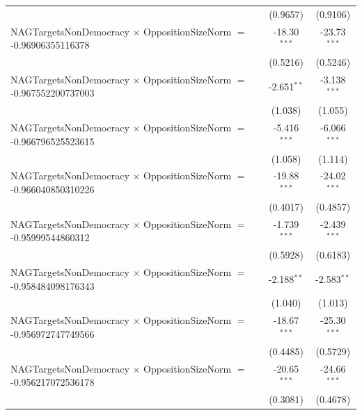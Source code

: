 \begin{tabular}{lcc}
                                                                                & (0.9657)             & (0.9106)\\   
   NAGTargetsNonDemocracy $\times$ OppositionSizeNorm $=$ -0.96906355116378     & -18.30$^{***}$       & -23.73$^{***}$\\   
                                                                                & (0.5216)             & (0.5246)\\   
   NAGTargetsNonDemocracy $\times$ OppositionSizeNorm $=$ -0.967552200737003    & -2.651$^{**}$        & -3.138$^{***}$\\   
                                                                                & (1.038)              & (1.055)\\   
   NAGTargetsNonDemocracy $\times$ OppositionSizeNorm $=$ -0.966796525523615    & -5.416$^{***}$       & -6.066$^{***}$\\   
                                                                                & (1.058)              & (1.114)\\   
   NAGTargetsNonDemocracy $\times$ OppositionSizeNorm $=$ -0.966040850310226    & -19.88$^{***}$       & -24.02$^{***}$\\   
                                                                                & (0.4017)             & (0.4857)\\   
   NAGTargetsNonDemocracy $\times$ OppositionSizeNorm $=$ -0.95999544860312     & -1.739$^{***}$       & -2.439$^{***}$\\   
                                                                                & (0.5928)             & (0.6183)\\   
   NAGTargetsNonDemocracy $\times$ OppositionSizeNorm $=$ -0.958484098176343    & -2.188$^{**}$        & -2.583$^{**}$\\   
                                                                                & (1.040)              & (1.013)\\   
   NAGTargetsNonDemocracy $\times$ OppositionSizeNorm $=$ -0.956972747749566    & -18.67$^{***}$       & -25.30$^{***}$\\   
                                                                                & (0.4485)             & (0.5729)\\   
   NAGTargetsNonDemocracy $\times$ OppositionSizeNorm $=$ -0.956217072536178    & -20.65$^{***}$       & -24.66$^{***}$\\   
                                                                                & (0.3081)             & (0.4678)\\   

\end{tabular}
